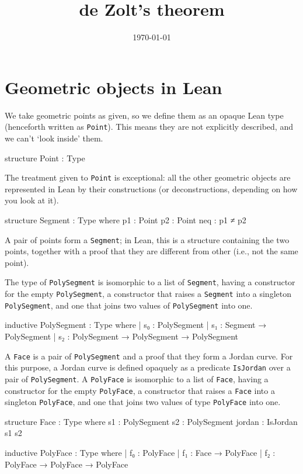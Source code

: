 \documentclass[12pt]{article} %
\date{\today}
\title{de Zolt's theorem}
\newcommand{\leanline}[1]{\texttt{#1}} %
\newcommand{\point}{\texttt{Point}} %
\newcommand{\segment}{\texttt{Segment}} %
\newcommand{\psegment}{\texttt{PolySegment}} %
\newcommand{\face}{\texttt{Face}} %
\newcommand{\pface}{\texttt{PolyFace}} %
\begin{document}
\maketitle %

\section{Geometric objects in Lean}\label{sec:geom-objects-lean} %

We take geometric points as given, so we define them as an opaque Lean type (henceforth written as \point). %
This means they are not explicitly described, and we can't ‘look inside’ them. %

\begin{leancode}
structure Point : Type
\end{leancode}
The treatment given to \point{} is exceptional: all the other geometric objects are represented in Lean by their constructions (or deconstructions, depending on how you look at it). %

\begin{leancode}
structure Segment : Type where
  p1 : Point
  p2 : Point
  neq : p1 ≠ p2
\end{leancode}

A pair of points form a \segment; in Lean, this is a structure
containing the two points, together with a proof that they are
different from other (i.e., not the same point). %

The type of \psegment{} is isomorphic to a list of \segment, having a constructor for the empty \psegment, a constructor that raises a \segment{} into a singleton \psegment, and one that joins two values of \psegment{} into one. %
\begin{leancode}
inductive PolySegment : Type where
| s₀ : PolySegment
| s₁ : Segment → PolySegment
| s₂ : PolySegment → PolySegment → PolySegment
\end{leancode}

A \face{} is a pair of \psegment{} and a proof that they form a Jordan
curve. %
For this purpose, a Jordan curve is defined opaquely as a predicate \leanline{IsJordan} over a pair of \psegment{}. %
A \pface{} is isomorphic to a list of \face, having a constructor for the empty \pface, a constructor that raises a \face{} into a singleton \pface, and one that joins two values of type \pface{} into one. %
\begin{leancode}
structure Face : Type where
  s1 : PolySegment
  s2 : PolySegment
  jordan : IsJordan s1 s2

inductive PolyFace : Type where
| f₀ : PolyFace
| f₁ : Face → PolyFace
| f₂ : PolyFace → PolyFace → PolyFace
\end{leancode}
\end{document}
